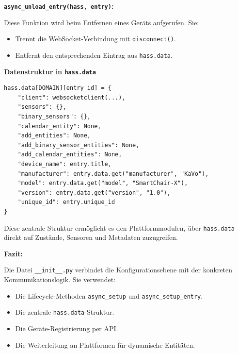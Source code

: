 \vspace{0.5cm}

\textbf{\texttt{async\_unload\_entry(hass, entry)}:}

Diese Funktion wird beim Entfernen eines Geräts aufgerufen. Sie:

\begin{itemize}
  \item Trennt die WebSocket-Verbindung mit \texttt{disconnect()}.\\
  \item Entfernt den entsprechenden Eintrag aus \texttt{hass.data}.
\end{itemize}

\vspace{0.5cm}

\textbf{Datenstruktur in \texttt{hass.data}}

\begin{verbatim}
hass.data[DOMAIN][entry_id] = {
    "client": websocketclient(...),
    "sensors": {},
    "binary_sensors": {},
    "calendar_entity": None,
    "add_entities": None,
    "add_binary_sensor_entities": None,
    "add_calendar_entities": None,
    "device_name": entry.title,
    "manufacturer": entry.data.get("manufacturer", "KaVo"),
    "model": entry.data.get("model", "SmartChair-X"),
    "version": entry.data.get("version", "1.0"),
    "unique_id": entry.unique_id
}
\end{verbatim}

Diese zentrale Struktur ermöglicht es den Plattformmodulen, über \texttt{hass.data} direkt auf Zustände, Sensoren und Metadaten zuzugreifen.

\vspace{0.5cm}

\textbf{Fazit:}

Die Datei \texttt{\_\_init\_\_.py} verbindet die Konfigurationsebene mit der konkreten Kommunikationslogik. Sie verwendet:

\begin{itemize}
  \item Die Lifecycle-Methoden \texttt{async\_setup} und \texttt{async\_setup\_entry}.\\
  \item Die zentrale \texttt{hass.data}-Struktur.\\
  \item Die Geräte-Registrierung per API.\\
  \item Die Weiterleitung an Plattformen für dynamische Entitäten.
\end{itemize}

